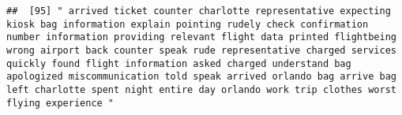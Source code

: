 \documentclass[
]{article}
\begin{document}
\begin{verbatim}
##  [95] " arrived ticket counter charlotte representative expecting kiosk bag information explain pointing rudely check confirmation number information providing relevant flight data printed flightbeing wrong airport back counter speak rude representative charged services quickly found flight information asked charged understand bag apologized miscommunication told speak arrived orlando bag arrive bag left charlotte spent night entire day orlando work trip clothes worst flying experience "                                                                                                                                                                                                                                                                                                                                                                                                                                                                                                                                                                                                                                                                                                                                                                                                                                                                                                                                                                                                                                                                                                                                                                                                                                                                                          

\end{verbatim}
\end{document}
